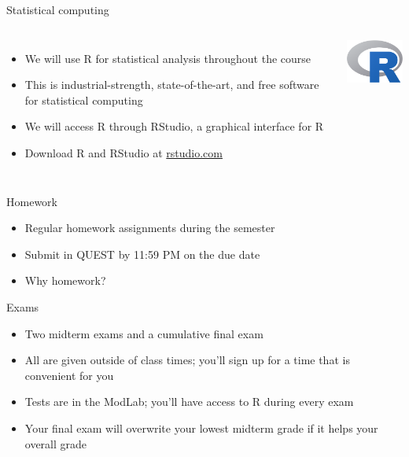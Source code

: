 \documentclass{beamer}\usepackage[]{graphicx}\usepackage[]{color}
\begin{document}
\begin{darkframes}
    \begin{frame}{Statistical computing}
      \begin{columns}[onlytextwidth]
          \begin{itemize}
            \item We will use \alert{R} for statistical analysis throughout the course
            \item This is industrial-strength, state-of-the-art, and free software for statistical computing
            \item We will access R through \alert{RStudio}, a graphical interface for R
            \item Download R and RStudio at \url{rstudio.com}
          \end{itemize}
          \includegraphics[width=1in]{R}
      \end{columns}
    \end{frame}

    \begin{frame}{Homework}
      \begin{itemize}
        \item Regular homework assignments during the semester
        \item Submit in QUEST by 11:59 PM on the due date
        \item Why homework?
      \end{itemize}
    \end{frame}

    \begin{frame}{Exams}
      \begin{itemize}
        \item Two midterm exams and a cumulative final exam
        \item All are given outside of class times; you'll sign up for a time that is convenient for you
        \item Tests are in the ModLab; you'll have access to R during every exam
        \item Your final exam will overwrite your lowest midterm grade if it helps your overall grade
      \end{itemize}
    \end{frame}


\end{darkframes}
\end{document}
